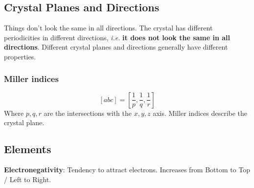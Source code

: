 \documentclass[a4paper, fontsize=8pt, landscape, DIV=1]{scrartcl}
\begin{document}
\begin{multicols*}{4}
  \subsection{Crystal Planes and Directions}
  \ifdefined\makeultracompact\else
    Things don't look the same in all directions. 
    The crystal has different periodicities in different directions, \textit{i.e.} \textbf{it does not look the same in all directions}. 
    Different crystal planes and directions generally have different properties.
  \fi
  
  \subsubsection{Miller indices}
  \[[abc] = \left[\frac{1}{p},\frac{1}{q},\frac{1}{r}\right]\]
  Where $p,q,r$ are the intersections with the $x,y,z$ axis. Miller indices describe the crystal plane.
  
  \ifdefined\makeultracompact\else
    \subsection{Elements}
    \textbf{Electronegativity}: Tendency to attract electrons. Increases from Bottom to Top / Left to Right.
  \fi



\end{multicols*}
\end{document}
